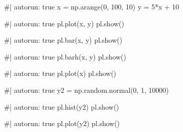 \documentclass[
  letterpaper,
  DIV=11,
  numbers=noendperiod]{scrreprt}
\newenvironment{Shaded}{\begin{snugshade}}{\end{snugshade}}
\newcommand{\NormalTok}[1]{\textcolor[rgb]{0.00,0.23,0.31}{#1}}
\begin{document}
\begin{Shaded}
\begin{Highlighting}[]
\NormalTok{\#| autorun: true}
\NormalTok{x = np.arange(0, 100, 10)}
\NormalTok{y = 5*x + 10}
\end{Highlighting}
\end{Shaded}

\begin{Shaded}
\begin{Highlighting}[]
\NormalTok{\#| autorun: true}
\NormalTok{pl.plot(x, y)}
\NormalTok{pl.show()}
\end{Highlighting}
\end{Shaded}

\begin{Shaded}
\begin{Highlighting}[]
\NormalTok{\#| autorun: true}
\NormalTok{pl.bar(x, y)}
\NormalTok{pl.show()}
\end{Highlighting}
\end{Shaded}

\begin{Shaded}
\begin{Highlighting}[]
\NormalTok{\#| autorun: true}
\NormalTok{pl.barh(x, y)}
\NormalTok{pl.show()}
\end{Highlighting}
\end{Shaded}

\begin{Shaded}
\begin{Highlighting}[]
\NormalTok{\#| autorun: true}
\NormalTok{pl.plot(x)}
\NormalTok{pl.show()}
\end{Highlighting}
\end{Shaded}

\begin{Shaded}
\begin{Highlighting}[]
\NormalTok{\#| autorun: true}
\NormalTok{y2 = np.random.normal(0, 1, 10000)}
\end{Highlighting}
\end{Shaded}

\begin{Shaded}
\begin{Highlighting}[]
\NormalTok{\#| autorun: true}
\NormalTok{pl.hist(y2)}
\NormalTok{pl.show()}
\end{Highlighting}
\end{Shaded}

\begin{Shaded}
\begin{Highlighting}[]
\NormalTok{\#| autorun: true}
\NormalTok{pl.plot(y2)}
\NormalTok{pl.show()}
\end{Highlighting}
\end{Shaded}
\end{document}
